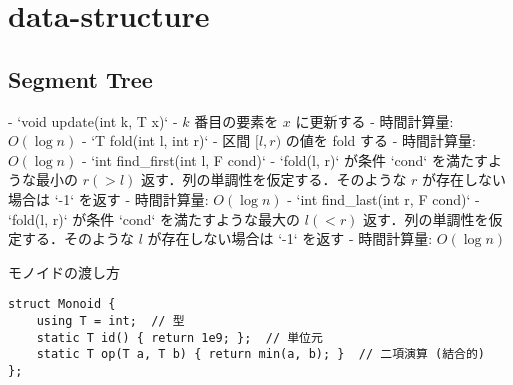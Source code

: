 \section{data-structure}

\subsection{Segment Tree}

\begin{small}
\begin{markdown}
- `void update(int k, T x)`
    - $k$ 番目の要素を $x$ に更新する
    - 時間計算量: $O(\log n)$
- `T fold(int l, int r)`
    - 区間 $[l, r)$ の値を fold する
    - 時間計算量: $O(\log n)$
- `int find\_first(int l, F cond)`
    - `fold(l, r)` が条件 `cond` を満たすような最小の $r (> l)$ 返す．列の単調性を仮定する．そのような $r$ が存在しない場合は `-1` を返す
    - 時間計算量: $O(\log n)$
- `int find\_last(int r, F cond)`
    - `fold(l, r)` が条件 `cond` を満たすような最大の $l (< r)$ 返す．列の単調性を仮定する．そのような $l$ が存在しない場合は `-1` を返す
    - 時間計算量: $O(\log n)$

\end{markdown}

モノイドの渡し方
\begin{lstlisting}
struct Monoid {
    using T = int;  // 型
    static T id() { return 1e9; };  // 単位元
    static T op(T a, T b) { return min(a, b); }  // 二項演算 (結合的)
};
\end{lstlisting}
\end{small}

